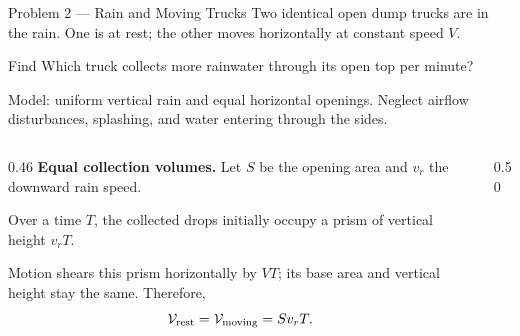 \begin{frame}{Problem 2 — Rain and Moving Trucks}
  \small
  Two identical open dump trucks are in the rain. One is at rest; the other
  moves horizontally at constant speed $V$.
  \begin{center}
    \resizebox{0.58\textwidth}{!}{}
  \end{center}
  \begin{block}{Find}
    Which truck collects more rainwater through its open top per minute?
  \end{block}
  \footnotesize
  Model: uniform vertical rain and equal horizontal openings.
  Neglect airflow disturbances, splashing, and water entering through the sides.
\end{frame}

\begin{solutionframe}
  \begin{columns}[T,onlytextwidth]
    \begin{column}{0.46\textwidth}
      \textbf{Equal collection volumes.}
      Let $S$ be the opening area and $v_r$ the downward rain speed.

      Over a time $T$, the collected drops initially occupy a prism
      of vertical height $v_rT$.

      Motion shears this prism horizontally by $VT$; its base area
      and vertical height stay the same. Therefore,
      \[
        \mathcal V_{\rm rest}=\mathcal V_{\rm moving}=S v_rT.
      \]
    \end{column}
    \begin{column}{0.50\textwidth}
      \centering
      \resizebox{\linewidth}{!}{}
    \end{column}
  \end{columns}
\end{solutionframe}

